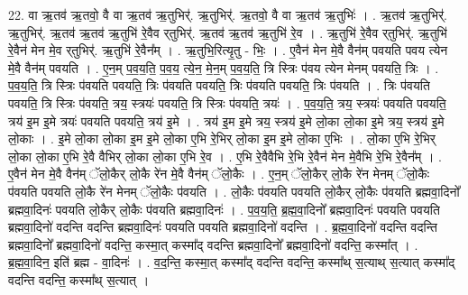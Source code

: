 \documentclass[17pt]{extarticle}
\begin{document}
22. वा ऋ॒तव॑ ऋ॒तवो॒ वै वा ऋ॒तव॑ ऋ॒तुभिर्॑. ऋ॒तुभिर्॑. ऋ॒तवो॒ वै वा ऋ॒तव॑ ऋ॒तुभिः॑ । . ऋ॒तव॑ ऋ॒तुभिर्॑. ऋ॒तुभिर्॑. ऋ॒तव॑ ऋ॒तव॑ ऋ॒तुभि॑ रे॒वैव र्‌तुभिर्॑. ऋ॒तव॑ ऋ॒तव॑ ऋ॒तुभि॑ रे॒व । . ऋ॒तुभि॑ रे॒वैव र्‌तुभिर्॑. ऋ॒तुभि॑ रे॒वैन॑ मेन मे॒व र्‌तुभिर्॑. ऋ॒तुभि॑ रे॒वैन᳚म् । . ऋ॒तुभि॒रित्यृ॒तु - भिः॒ । . ए॒वैन॑ मेन मे॒वै वैन॑म् पवयति पवय त्येन मे॒वै वैन॑म् पवयति । . ए॒न॒म् प॒व॒य॒ति॒ प॒व॒य॒ त्ये॒न॒ मे॒न॒म् प॒व॒य॒ति॒ त्रि स्त्रिः प॑वय त्येन मेनम् पवयति॒ त्रिः । . प॒व॒य॒ति॒ त्रि स्त्रिः प॑वयति पवयति॒ त्रिः प॑वयति पवयति॒ त्रिः प॑वयति पवयति॒ त्रिः प॑वयति । . त्रिः प॑वयति पवयति॒ त्रि स्त्रिः प॑वयति॒ त्रय॒ स्त्रयः॑ पवयति॒ त्रि स्त्रिः प॑वयति॒ त्रयः॑ । . प॒व॒य॒ति॒ त्रय॒ स्त्रयः॑ पवयति पवयति॒ त्रय॑ इ॒म इ॒मे त्रयः॑ पवयति पवयति॒ त्रय॑ इ॒मे । . त्रय॑ इ॒म इ॒मे त्रय॒ स्त्रय॑ इ॒मे लो॒का लो॒का इ॒मे त्रय॒ स्त्रय॑ इ॒मे लो॒काः । . इ॒मे लो॒का लो॒का इ॒म इ॒मे लो॒का ए॒भि रे॒भिर् लो॒का इ॒म इ॒मे लो॒का ए॒भिः । . लो॒का ए॒भि रे॒भिर् लो॒का लो॒का ए॒भि रे॒वै वैभिर् लो॒का लो॒का ए॒भि रे॒व । . ए॒भि रे॒वैवैभि रे॒भि रे॒वैन॑ मेन मे॒वैभि रे॒भि रे॒वैन᳚म् । . ए॒वैन॑ मेन मे॒वै वैन॑म् ॅलो॒कैर् लो॒कै रे॑न मे॒वै वैन॑म् ॅलो॒कैः । . ए॒न॒म् ॅलो॒कैर् लो॒कै रे॑न मेनम् ॅलो॒कैः प॑वयति पवयति लो॒कै रे॑न मेनम् ॅलो॒कैः प॑वयति । . लो॒कैः प॑वयति पवयति लो॒कैर् लो॒कैः प॑वयति ब्रह्मवा॒दिनो᳚ ब्रह्मवा॒दिनः॑ पवयति लो॒कैर् लो॒कैः प॑वयति ब्रह्मवा॒दिनः॑ । . प॒व॒य॒ति॒ ब्र॒ह्म॒वा॒दिनो᳚ ब्रह्मवा॒दिनः॑ पवयति पवयति ब्रह्मवा॒दिनो॑ वदन्ति वदन्ति ब्रह्मवा॒दिनः॑ पवयति पवयति ब्रह्मवा॒दिनो॑ वदन्ति । . ब्र॒ह्म॒वा॒दिनो॑ वदन्ति वदन्ति ब्रह्मवा॒दिनो᳚ ब्रह्मवा॒दिनो॑ वदन्ति॒ कस्मा॒त् कस्मा᳚द् वदन्ति ब्रह्मवा॒दिनो᳚ ब्रह्मवा॒दिनो॑ वदन्ति॒ कस्मा᳚त् । . ब्र॒ह्म॒वा॒दिन॒ इति॑ ब्रह्म - वा॒दिनः॑ । . व॒द॒न्ति॒ कस्मा॒त् कस्मा᳚द् वदन्ति वदन्ति॒ कस्मा᳚थ् स॒त्याथ् स॒त्यात् कस्मा᳚द् वदन्ति वदन्ति॒ कस्मा᳚थ् स॒त्यात् । \newline
\end{document}
